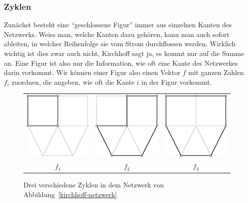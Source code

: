\subsubsection{Zyklen}
Zunächst besteht eine ``geschlossene Figur'' immer aus einzelnen
Kanten des Netzwerks. Weiss man, welche Kanten dazu gehören, kann
man auch sofort ableiten, in welcher Reihenfolge sie vom Strom
durchflossen werden. Wirklich wichtig ist dies zwar auch nicht,
Kirchhoff sagt ja, es kommt nur auf die Summe an. Eine 
Figur ist also nur die Information, wie oft eine Kante des Netzwerkes darin
vorkommt. Wir können einer Figur also einen Vektor $f$ mit ganzen
Zahlen $f_i$ zuordnen, die angeben, wie oft die Kante $i$ in der
Figur vorkommt.
\begin{figure}
\begin{center}
\begin{tabular}{ccc}
\includegraphics[width=0.25\hsize]{images/kirchhoff-3}&
\includegraphics[width=0.25\hsize]{images/kirchhoff-4}&
\includegraphics[width=0.25\hsize]{images/kirchhoff-5}
\\
$f_1$&$f_2$&$f_3$
\end{tabular}
\end{center}
\caption{Drei verschiedene Zyklen in dem Netzwerk von Abbildung~\ref{kirchhoff-netzwerk}
\label{kirchhoff-zyklen}}
\end{figure}

